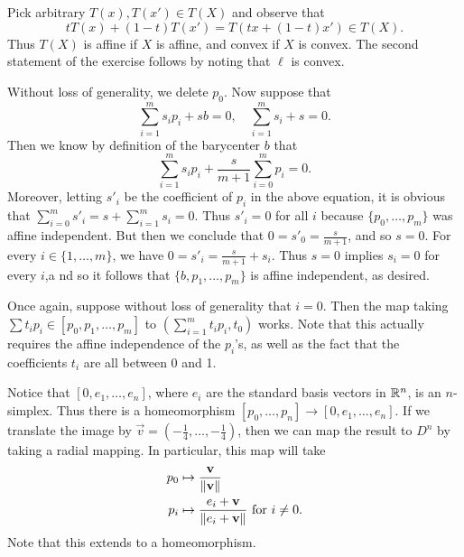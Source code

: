 \documentclass[../../solutions.tex]{subfiles}
\begin{document}
\begin{exercise} \leavevmode
Pick arbitrary $T(x),T(x')\in T(X)$ and observe that \[tT(x)+(1-t)T(x')=T(tx+(1-t)x')\in T(X).\] Thus $T(X)$ is affine if $X$ is affine, and convex if $X$ is convex. The second statement of the exercise follows by noting that $\ell$ is convex. 
\end{exercise} 

\begin{exercise} \leavevmode
Without loss of generality, we delete $p_0$. Now suppose that \[\sum_{i=1}^ms_ip_i+sb=0,\quad\sum_{i=1}^ms_i+s=0.\] Then we know by definition of the barycenter $b$ that \[\sum_{i=1}^ms_ip_i+\frac s{m+1}\sum_{i=0}^mp_i=0.\] Moreover, letting $s'_i$ be the coefficient of $p_i$ in the above equation, it is obvious that $\sum_{i=0}^ms'_i=s+\sum_{i=1}^ms_i=0$. Thus $s'_i=0$ for all $i$ because $\{p_0,\dots,p_m\}$ was affine independent. But then we conclude that $0=s'_0=\frac s{m+1}$, and so $s=0$. For every $i\in\{1,\dots,m\}$, we have $0=s'_i=\frac s{m+1}+s_i$. Thus $s=0$ implies $s_i=0$ for every $i$,a nd so it follows that $\{b,p_1,\dots,p_m\}$ is affine independent, as desired.
\end{exercise} 

\begin{exercise} \leavevmode
Once again, suppose without loss of generality that $i=0$. Then the map taking $\sum t_ip_i\in[p_0,p_1,\dots,p_m]$ to $\left(\sum_{i=1}^mt_ip_i,t_0\right)$ works. Note that this actually requires the affine independence of the $p_i$'s, as well as the fact that the coefficients $t_i$ are all between 0 and 1. 
\end{exercise} 

\begin{exercise} \leavevmode
Notice that $[0,e_1,\dots,e_n]$, where $e_i$ are the standard basis vectors in $\mathbb{R}^n$, is an $n$-simplex. Thus there is a homeomorphism $[p_0,\dots,p_n]\to[0,e_1,\dots,e_n]$. If we translate the image by $\vec v=(-\frac14,\dots,-\frac14)$, then we can map the result to $D^n$ by taking a radial mapping. In particular, this map will take \begin{align*}p_0&\mapsto\frac{\mathbf v}{\lVert\mathbf v\rVert}\\p_i&\mapsto\frac{e_i+\mathbf v}{\lVert e_i+\mathbf v\rVert}~\text{for}~i\ne0.\end{align*} Note that this extends to a homeomorphism. 
\end{exercise} 
\end{document}
